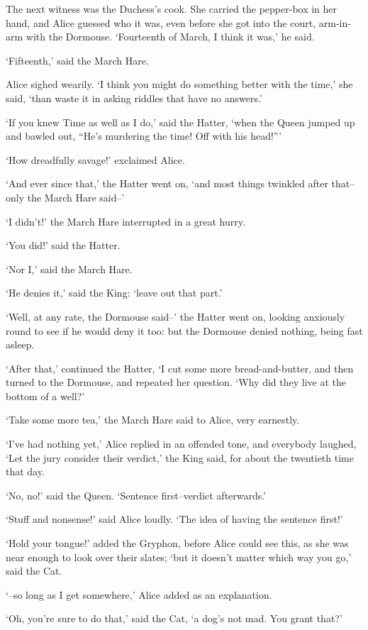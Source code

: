\documentclass[statementpaper,twoside,openany]{memoir}
\begin{document}
The next witness was the Duchess's cook. She carried the pepper-box in her hand, and Alice guessed who it was, even before she got into the court, arm-in-arm with the Dormouse. `Fourteenth of March, I think it was,' he said.

`Fifteenth,' said the March Hare.

Alice sighed wearily. `I think you might do something better with the time,' she said, `than waste it in asking riddles that have no answers.'

`If you knew Time as well as I do,' said the Hatter, `when the Queen jumped up and bawled out, ``He's murdering the time! Off with his head!'''

`How dreadfully savage!' exclaimed Alice.

`And ever since that,' the Hatter went on, `and most things twinkled after that--only the March Hare said--'

`I didn't!' the March Hare interrupted in a great hurry.

`You did!' said the Hatter.

`Nor I,' said the March Hare.

`He denies it,' said the King: `leave out that part.'

`Well, at any rate, the Dormouse said--' the Hatter went on, looking anxiously round to see if he would deny it too: but the Dormouse denied nothing, being fast asleep.

`After that,' continued the Hatter, `I cut some more bread-and-butter, and then turned to the Dormouse, and repeated her question. `Why did they live at the bottom of a well?'

`Take some more tea,' the March Hare said to Alice, very earnestly.

`I've had nothing yet,' Alice replied in an offended tone, and everybody laughed, `Let the jury consider their verdict,' the King said, for about the twentieth time that day.

`No, no!' said the Queen. `Sentence first--verdict afterwards.'

`Stuff and nonsense!' said Alice loudly. `The idea of having the sentence first!'

`Hold your tongue!' added the Gryphon, before Alice could see this, as she was near enough to look over their slates; `but it doesn't matter which way you go,' said the Cat.

`--so long as I get somewhere,' Alice added as an explanation.

`Oh, you're sure to do that,' said the Cat, `a dog's not mad. You grant that?'
\end{document}
